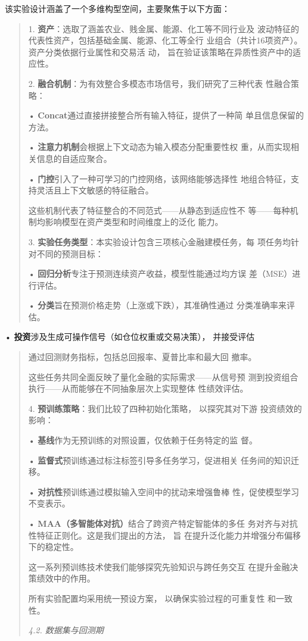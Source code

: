 \documentclass[UTF8]{ctexart}
\begin{document}
该实验设计涵盖了一个多维构型空间，主要聚焦于以下方面：

\begin{quote}
1. \textbf{资产}：选取了涵盖农业、贱金属、能源、化工等不同行业及
波动特征的代表性资产，包括基础金属、能源、化工等全行
业组合（共计16项资产）。资产分类依据行业属性和交易活 动，
旨在验证该策略在异质性资产中的适应性。

2. \textbf{融合机制}：为有效整合多模态市场信号，我们研究了三种代表
性融合策略：

• \textbf{Concat}通过直接拼接整合所有输入特征，提供了一种简
单且信息保留的方法。

• \textbf{注意力机制}会根据上下文动态为输入模态分配重要性权
重，从而实现相关信息的自适应聚合。

• \textbf{门控}引入了一种可学习的门控网络，该网络能够选择性
地组合特征，支持灵活且上下文敏感的特征融合。

这些机制代表了特征整合的不同范式------从静态到适应性不
等------每种机制均影响模型在资产类型和时间维度上的泛化 能力。

3. \textbf{实验任务类型}：本实验设计包含三项核心金融建模任务，每
项任务均针对不同的预测目标：

• \textbf{回归分析}专注于预测连续资产收益，模型性能通过均方误
差（MSE）进行评估。

• \textbf{分类}旨在预测价格走势（上涨或下跌），其准确性通过
分类准确率来评估。
\end{quote}

• \textbf{投资}涉及生成可操作信号（如仓位权重或交易决策）， 并接受评估

\begin{quote}
通过回测财务指标，包括总回报率、夏普比率和最大回 撤率。

这些任务共同全面反映了量化金融的实际需求------从信号预
测到投资组合执行------从而能够在不同抽象层次上实现整体 性绩效评估。

4. \textbf{预训练策略}：我们比较了四种初始化策略， 以探究其对下游
投资绩效的影响：

• \textbf{基线}作为无预训练的对照设置，仅依赖于任务特定的监 督。

• \textbf{监督式}预训练通过标注标签引导多任务学习，促进相关
任务间的知识迁移。

• \textbf{对抗性}预训练通过模拟输入空间中的扰动来增强鲁棒
性，促使模型学习不变表示。

• \textbf{MAA（多智能体对抗）}结合了跨资产特定智能体的多任
务对齐与对抗性特征正则化。这是我们提出的方法， 旨
在提升泛化能力并增强分布偏移下的稳定性。

这一系列预训练技术使我们能够探究先验知识与跨任务交互
在提升金融决策绩效中的作用。

所有实验配置均采用统一预设方案， 以确保实验过程的可重复性 和一致性。

\emph{4.2. 数据集与回测期}
\end{quote}
\end{document}
